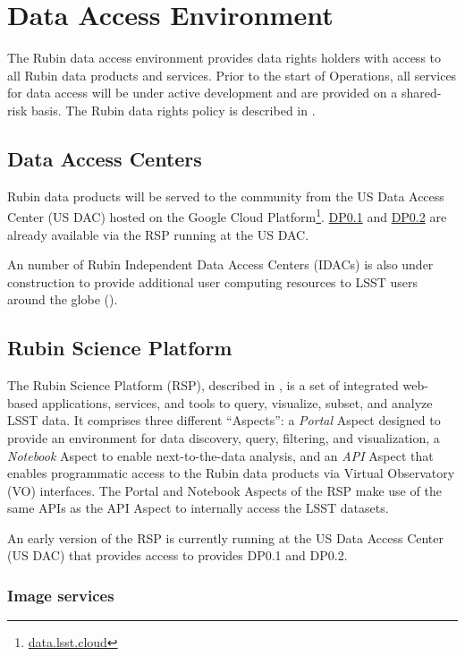 \section{Data Access Environment} \label{access}

The Rubin data access environment provides data rights holders with access to all Rubin data products and services. 
Prior to the start of Operations, all services for data access will be under active development and are provided on a shared-risk basis. 
The Rubin data rights policy is described in  .

\subsection{Data Access Centers}

Rubin data products will be served to the community from the US Data Access Center (US DAC) hosted on the Google Cloud Platform\footnote{\url{data.lsst.cloud}}.
\hyperref[sec:dp01]{DP0.1} and \hyperref[sec:dp02]{DP0.2}  are already available via the RSP running at the US DAC.

An number of Rubin Independent Data Access Centers (IDACs) is also under construction to provide additional user computing resources to LSST users around the globe ().

\subsection{Rubin Science Platform}

The Rubin Science Platform (RSP), described in , is a set of integrated web-based applications, services, and tools to query, visualize, subset, and analyze LSST data.
It comprises three different ``Aspects'': a \emph{Portal} Aspect designed to provide an environment for data discovery, query, filtering, and visualization, a \emph{Notebook} Aspect to enable next-to-the-data analysis, and an \emph{API} Aspect that enables programmatic access to the Rubin data products via Virtual Observatory (VO) interfaces.
The Portal and Notebook Aspects of the RSP make use of the same APIs as the API Aspect to internally access the LSST datasets.

An early version of the RSP is currently running at the US Data Access Center (US DAC) that provides access to provides DP0.1 and DP0.2. 

\subsubsection{Image services}

